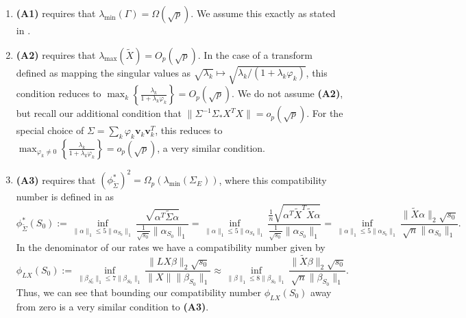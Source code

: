 \documentclass[11pt]{article}
\newcommand{\postCov}{\Sigma_*}
\numberwithin{equation}{section}
\begin{document}
\begin{enumerate}
	\item {\bf (A1)} requires that $\lambda_{\min}(\Gamma) = \Omega(\sqrt{p})$. We assume this exactly as stated in \cite{CBM2020}.
	\item {\bf (A2)} requires that $\lambda_{\max}(\tilde{X}) = O_p(\sqrt{p})$. In the case of a transform defined as mapping the singular values as $\sqrt{\lambda_k} \mapsto \sqrt{\lambda_k/(1+\lambda_k \varphi_k)}$, this condition reduces to $\max_{k}\left\{\frac{\lambda_k}{1+\lambda_k \varphi_k} \right\} = O_p(\sqrt{p})$. We do not assume {\bf (A2)}, but recall our additional condition that $\|\Sigma^{-1} \postCov  X^T X\|= o_p(\sqrt{p})$. For the special choice of $\Sigma = \sum_k \varphi_k \mathbf{v}_k \mathbf{v}_k^T$, this reduces to $\max_{\varphi_k \neq 0}\left\{\frac{\lambda_k}{1+\lambda_k \varphi_k} \right\} = o_p(\sqrt{p})$, a very similar condition.
	\item {\bf (A3)} requires that $(\phi_{\tilde{\Sigma}}^*)^2  = \Omega_p(\lambda_{\min}(\Sigma_E))$, where this compatibility number is defined in \cite{CBM2020} as
		$$
		\phi_{\tilde{\Sigma}}^*(S_0) := \inf_{\|\alpha\|_1 \leq 5\|\alpha_{S_0}\|_1 } \frac{\sqrt{\alpha^T \tilde{\Sigma} \alpha}}{\frac{1}{\sqrt{s_0}}\|\alpha_{S_0}\|_1} = \inf_{\|\alpha\|_1 \leq 5\|\alpha_{S_0}\|_1 } \frac{\frac{1}{n}\sqrt{\alpha^T \tilde{X}^T \tilde{X} \alpha}}{\frac{1}{\sqrt{s_0}}\|\alpha_{S_0}\|_1}  = \inf_{\|\alpha\|_1 \leq 5\|\alpha_{S_0}\|_1 } \frac{\|\tilde{X}\alpha\|_2 \sqrt{s_0}}{\sqrt{n}\|\alpha_{S_0}\|_1}.
		$$ 
		In the denominator of our rates we have a compatibility number given by
		$$
		\phi_{LX}(S_0) := \inf_{ \| \beta_{S_0^c}\|_1 \leq7\|\beta_{S_0} \|_1} \frac{\|LX \beta\|_2 \sqrt{s_0}}{\|X\|\|\beta_{S_0}\|_1} \approx  \inf_{ \| \beta\|_1 \leq 8\|\beta_{S_0} \|_1} \frac{\|\tilde{X} \beta\|_2 \sqrt{s_0}}{\sqrt{n} \|\beta_{S_0}\|_1}.
		$$
		Thus, we can see that bounding our compatibility number $\phi_{LX}(S_0)$ away from zero is a very similar condition to {\bf (A3)}.
\end{enumerate}
\end{document}
